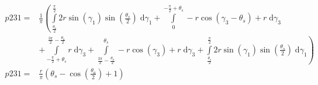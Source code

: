 \begin{align}
    p231 =&\frac{1}{\pi} \left(\int\limits_{\frac{\theta_{s}}{2}}^{\frac{\pi}{2}}2 r \sin{\left (\gamma_{1} \right )} \sin{\left (\frac{\theta_{s}}{2} \right )}\;\mathrm{d}\gamma_{1}+\int\limits_{0}^{- \frac{\pi}{2} + \theta_{s}}- r \cos{\left (\gamma_{3} - \theta_{s} \right )} + r\;\mathrm{d}\gamma_{3}\right.\\
 &\left.+\int\limits_{- \frac{\pi}{2} + \theta_{s}}^{\frac{3 \pi}{2} - \frac{\theta_{a}}{2}}r\;\mathrm{d}\gamma_{3}+\int\limits_{\frac{3 \pi}{2} - \frac{\theta_{a}}{2}}^{\theta_{s}}- r \cos{\left (\gamma_{3} \right )} + r\;\mathrm{d}\gamma_{3}+\int\limits_{\frac{\theta_{s}}{2}}^{\frac{\pi}{2}}2 r \sin{\left (\gamma_{1} \right )} \sin{\left (\frac{\theta_{s}}{2} \right )}\;\mathrm{d}\gamma_{1}\right)\\
    p231 =& \frac{r}{\pi} \left(\theta_{s} - \cos{\left (\frac{\theta_{a}}{2} \right )} + 1\right)
\end{align}
